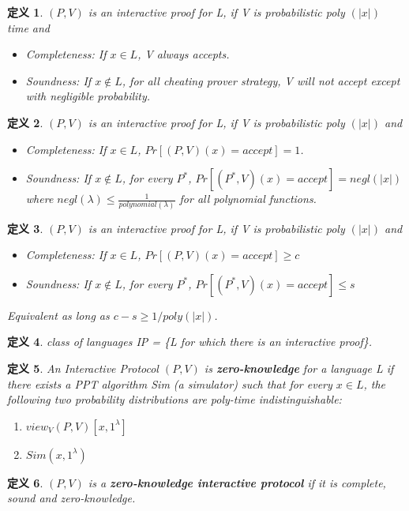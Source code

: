 \documentclass[10pt]{ctexart}
\newtheorem{definition}{定义}
\begin{document}
\begin{definition}
	$(P, V)$ is an interactive proof for L, if V is probabilistic poly $(|x|)$ time and
	\begin{itemize}
		\item Completeness: If $x \in L$, V always accepts.
		\item Soundness: If $x \notin L$, for all {\color{blue}cheating prover strategy}, V will not accept
		except with negligible probability.
	\end{itemize}
\end{definition}

\begin{definition}
	$(P, V)$ is an interactive proof for L, if V is probabilistic poly $(|x|)$ and
	\begin{itemize}
		\item Completeness: If $x\in L$, $Pr[(P,V)(x)= accept]=1$.
		\item Soundness: If $x \notin L$, for every $P^*$, $Pr[(P^*,V)(x)= accept]=negl(|x|)$
		where $negl(\lambda) \le \frac{1}{polynomial(\lambda)}$ for all polynomial functions.
	\end{itemize}
\end{definition}

\begin{definition}
	$(P, V)$ is an interactive proof for L, if V is probabilistic poly $(|x|)$ and 
	\begin{itemize}
		\item Completeness: If $x\in L$, $Pr[(P,V)(x)= accept] \ge c$
		\item Soundness: If $x \notin L$, for every $P^*$, $Pr[(P^*,V)(x)= accept] \le s$
	\end{itemize}
	Equivalent as long as $ c-s \ge 1/poly(|x|)$.
\end{definition}

\begin{definition}
	class of languages IP =
\{L for which there is an interactive proof\}.
\end{definition}

\begin{definition}
	An Interactive Protocol $(P,V)$ is \textbf{zero-knowledge} for a language L if there exists a PPT algorithm Sim (a simulator) such that for every $x \in L$, the following two probability distributions are poly-time indistinguishable:
	\begin{enumerate}
		\item $view_V(P,V)[x, 1^\lambda]$
		\item $Sim(x, 1^\lambda)$
	\end{enumerate}
\end{definition}
\begin{definition}
	$(P,V)$ is a \textbf{zero-knowledge interactive protocol} if it is complete, sound and zero-knowledge.
\end{definition}
\end{document}
